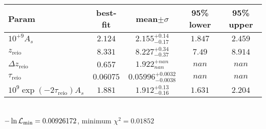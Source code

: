 \begin{tabular}{|l|c|c|c|c|} 
 \hline 
Param & best-fit & mean$\pm\sigma$ & 95\% lower & 95\% upper \\ \hline 
$10^{+9}A_{s }$ &$2.124$ & $2.155_{-0.17}^{+0.14}$ & $1.847$ & $2.459$ \\ 
$z_\mathrm{reio}$ &$8.331$ & $8.227_{-0.37}^{+0.34}$ & $7.49$ & $8.914$ \\ 
$\Delta z_\mathrm{reio}$ &$0.657$ & $1.922_{nan}^{+nan}$ & $nan$ & $nan$ \\ 
$\tau_\mathrm{reio}$ &$0.06075$ & $0.05996_{-0.0038}^{+0.0032}$ & $nan$ & $nan$ \\ 
$10^9 \exp(-2 \tau_\mathrm{reio}) A_s$ &$1.881$ & $1.912_{-0.16}^{+0.13}$ & $1.631$ & $2.204$ \\ 
\hline 
 \end{tabular} \\ 
$-\ln{\cal L}_\mathrm{min} =0.00926172$, minimum $\chi^2=0.01852$ \\ 
